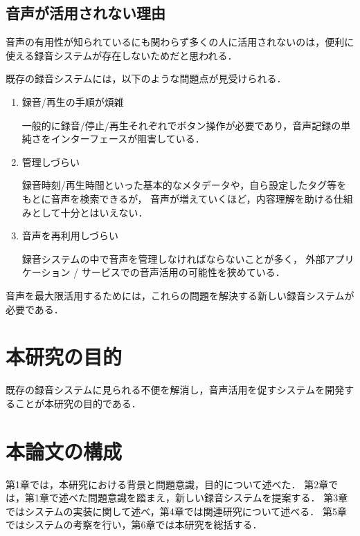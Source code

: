 \subsection{音声が活用されない理由}

音声の有用性が知られているにも関わらず多くの人に活用されないのは，便利に使える録音システムが存在しないためだと思われる．

既存の録音システムには，以下のような問題点が見受けられる．

\begin{enumerate}
\item 録音/再生の手順が煩雑

一般的に録音/停止/再生それぞれでボタン操作が必要であり，音声記録の単純さをインターフェースが阻害している．

\item 管理しづらい

録音時刻/再生時間といった基本的なメタデータや，自ら設定したタグ等をもとに音声を検索できるが，
音声が増えていくほど，内容理解を助ける仕組みとして十分とはいえない．

\item 音声を再利用しづらい

録音システムの中で音声を管理しなければならないことが多く，
外部アプリケーション / サービスでの音声活用の可能性を狭めている．

\end{enumerate}

音声を最大限活用するためには，これらの問題を解決する新しい録音システムが必要である．

\section{本研究の目的}

既存の録音システムに見られる不便を解消し，音声活用を促すシステムを開発することが本研究の目的である．

\section{本論文の構成}

第1章では，本研究における背景と問題意識，目的について述べた．
第2章では，第1章で述べた問題意識を踏まえ，新しい録音システムを提案する．
第3章ではシステムの実装に関して述べ，第4章では関連研究について述べる．
第5章ではシステムの考察を行い，第6章では本研究を総括する．